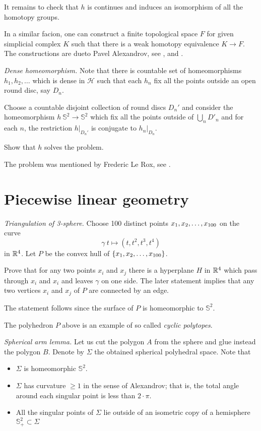It remains to check that $h$ is continues 
and induces an isomorphism of all the homotopy groups.

In a similar facion, one can construct a finite topological space $F$ for given simplicial complex $K$ 
such that 
there is a weak homotopy equivalence $K\to F$.
The constructions are dueto Pavel Alexandrov, see \cite{alexandrov-finite}, and \cite{mccord}.

\textit{Dense homeomorphism.}
Note that there is countable set of homeomorphisms $h_1,h_2,\dots$ which is dense in $\mathcal{H}$
such that
each $h_n$ fix all the points outside an open round disc, say $D_n$.

Choose a countable disjoint collection of round discs $D_n'$
and consider the homeomorphism $h\:\mathbb S^2\to \mathbb S^2$
which fix all the points outside of $\bigcup_nD'_n$ and
for each $n$,
the restriction $h|_{D_n'}$ is conjugate to $h_n|_{D_n}$. 

Show that $h$ solves the problem.

 The problem was mentioned by Frederic Le Rox, see \cite{rox}.



\section*{Piecewise linear geometry}


\textit{Triangulation of 3-sphere.}
Choose 100 distinct points $x_1,x_2,\z\dots,x_{100}$
on the curve 
\[\gamma\:t\mapsto (t,t^2,t^3,t^4)\] 
in $\mathbb{R}^4$.
Let $P$ be the convex hull of $\{x_1,x_2,\z\dots,x_{100}\}$.

Prove that for any two points $x_i$ and $x_j$ there is a hyperplane $H$ in $\mathbb{R}^4$ which pass through $x_i$ and $x_i$ and leaves $\gamma$ on one side.
The later statement implies that any two vertices $x_i$ and $x_j$
of $P$ are connected by an edge.

The statement follows
since the surface of $P$ is homeomorphic to $\mathbb{S}^2$.

The polyhedron $P$ above is an example 
of so called \emph{cyclic polytopes}.

\textit{Spherical arm lemma.}
Let us cut the polygon $A$ from the sphere and glue instead the polygon $B$.
Denote by $\Sigma$ the obtained spherical polyhedral space.
Note that 
\begin{itemize}
\item $\Sigma$ is homeomorphic $\mathbb S^2$.
\item $\Sigma$ has curvature $\ge 1$ in the sense of Alexandrov; that is, the total angle around each singular point is less than $2\cdot \pi$.
\item All the singular points of $\Sigma$ 
lie outside of an isometric copy of a hemisphere $\mathbb{S}^2_+\subset \Sigma$
\end{itemize}

